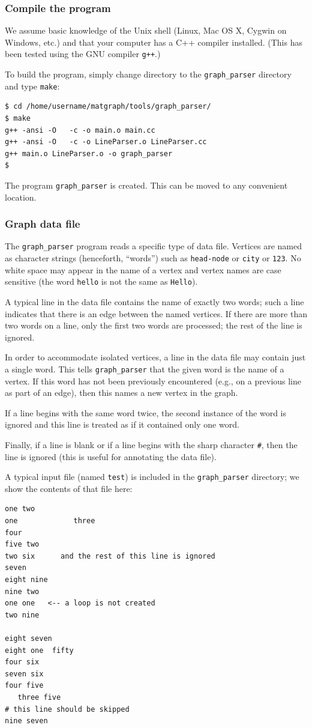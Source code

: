 \documentclass[12pt]{amsart}
\begin{document}
\subsubsection*{Compile the program}
We assume basic knowledge of the Unix shell (Linux, Mac OS X, Cygwin
on Windows, etc.) and that your computer has a C++ compiler installed.
(This has been tested using the GNU compiler \verb|g++|.) 

To build the program, simply change directory to the
\verb|graph_parser| directory and type \verb|make|:
\begin{verbatim}
$ cd /home/username/matgraph/tools/graph_parser/
$ make
g++ -ansi -O   -c -o main.o main.cc
g++ -ansi -O   -c -o LineParser.o LineParser.cc
g++ main.o LineParser.o -o graph_parser
$
\end{verbatim}
The program \verb|graph_parser| is created. This can be moved to any
convenient location.

\subsubsection*{Graph data file}
The \verb|graph_parser| program reads a specific type of data
file. Vertices are named as character strings (henceforth, ``words'')
such as \verb|head-node| or \verb|city| or \verb|123|. No white space
may appear in the name of a vertex and vertex names are case sensitive
(the word \verb|hello| is not the same as \verb|Hello|).

A typical line in the data file contains the name of exactly two
words; such a line indicates that there is an edge between the
named vertices. If there are more than two words on a line, only the
first two words are processed; the rest of the line is ignored.

In order to accommodate isolated vertices, a line in the data file may
contain just a single word. This tells \verb|graph_parser| that the
given word is the name of a vertex. If this word has not been
previously encountered (e.g., on a previous line as part of an edge),
then this names a new vertex in the graph. 

If a line begins with the same word twice, the second instance of the
word is ignored and this line is treated as if it contained only one
word.

Finally, if a line is blank or if a line begins with the sharp
character \verb|#|, then the line is ignored (this is useful for
annotating the data file). 

A typical input file (named \verb|test|) is included in the
\verb|graph_parser| directory; we show the contents of that file here:
\begin{verbatim}
one two
one             three
four
five two
two six      and the rest of this line is ignored
seven
eight nine
nine two
one one   <-- a loop is not created
two nine

eight seven
eight one  fifty
four six
seven six
four five
   three five
# this line should be skipped
nine seven
\end{verbatim}
\end{document}
